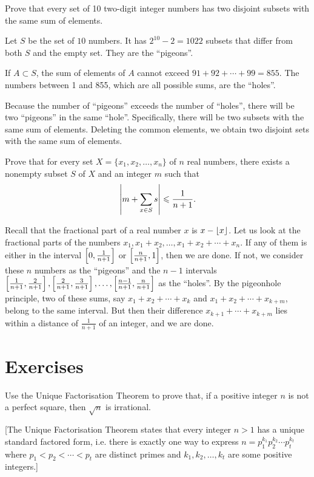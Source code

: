 \begin{exercise}[IMO 1972]
Prove that every set of 10 two-digit integer numbers has two disjoint subsets with the same sum of elements.
\end{exercise}

\begin{solution}
Let $S$ be the set of $10$ numbers. It has $2^{10}-2=1022$ subsets that differ from both $S$ and the empty set. They are the ``pigeons''.

If $A\subset S$, the sum of elements of $A$ cannot exceed $91+92+\cdots+99=855$. The numbers between 1 and 855, which are all possible sums, are the ``holes''.

Because the number of ``pigeons'' exceeds the number of ``holes'', there will be two ``pigeons'' in the same ``hole''. Specifically, there will be two subsets with the same sum of elements. Deleting the common elements, we obtain two disjoint sets with the same sum of elements.
\end{solution}

\begin{exercise}[Putnam 2006]
Prove that for every set $X=\{x_1,x_2,\dots,x_n\}$ of $n$ real numbers, there exists a nonempty subset $S$ of $X$ and an integer $m$ such that
\[\left|m+\sum_{x\in S}s\right|\leqslant\frac{1}{n+1}.\]
\end{exercise}

\begin{solution}
Recall that the fractional part of a real number $x$ is $x-\left\lfloor x \right\rfloor$. Let us look at the fractional parts of the numbers $x_1,x_1+x_2,\dots,x_1+x_2+\cdots+x_n$. If any of them is either in the interval $\left[0,\frac{1}{n+1}\right]$ or $\left[\frac{n}{n+1},1\right]$, then we are done. If not, we consider these $n$ numbers as the ``pigeons'' and the $n-1$ intervals $\left[\frac{1}{n+1},\frac{2}{n+1}\right],\left[\frac{2}{n+1},\frac{3}{n+1}\right],\dots,\left[\frac{n-1}{n+1},\frac{n}{n+1}\right]$ as the ``holes''. By the pigeonhole principle, two of these sums, say $x_1+x_2+\cdots+x_k$ and $x_1+x_2+\cdots+x_{k+m}$, belong to the same interval. But then their difference $x_{k+1}+\cdots+x_{k+m}$ lies within a distance of $\frac{1}{n+1}$ of an integer, and we are done.
\end{solution}
\pagebreak

\section*{Exercises}
\begin{prbm}
Use the Unique Factorisation Theorem to prove that, if a positive integer $n$ is not a perfect square, then $\sqrt{n}$ is irrational.

[The Unique Factorisation Theorem states that every integer $n>1$ has a unique standard factored form, i.e. there is exactly one way to express $n=p_1^{k_1}p_2^{k_2}\cdots p_t^{k_t}$ where $p_1<p_2<\cdots<p_t$ are distinct primes and $k_1,k_2,\dots,k_t$ are some positive integers.]
\end{prbm}

